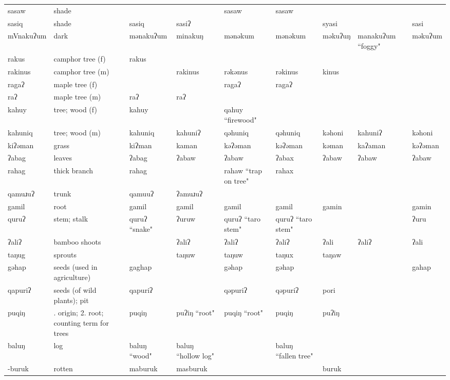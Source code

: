 \begin{landscape}
\begin{longtable}{*{9}{>{\raggedright\arraybackslash}p{}}}
\text{*}sasaw & shade &  &  & sasaw & sasaw &  &  & \\
\text{*}sasiq & shade & sasiq & sasiʔ &  &  & syasi &  & sasi\\
\text{*}mVnakuʔum & dark & mənakuʔum & minakuŋ & mənəkum & mənəkum & məkuʔuŋ & manakuʔum ``foggy" & məkuʔum\\
\text{*}rakus & camphor tree (f) & rakus &  &  &  &  &  & \\
\text{*}rakinus & camphor tree (m) &  & rakinus & rəkənus & rəkinus & kinus &  & \\
\text{*}ragaʔ & maple tree (f) &  &  & ragaʔ & ragaʔ &  &  & \\
\text{*}raʔ & maple tree (m) & raʔ & raʔ &  &  &  &  & \\
\text{*}kahuy & tree; wood (f) & kahuy &  & qahuy ``firewood" &  &  &  & \\
\text{*}kahuniq & tree; wood (m) & kahuniq & kahuniʔ & qəhuniq & qəhuniq & kəhoni & kahuniʔ & kəhoni\\
\text{*}kiʔəman & grass & kiʔman & kaman & kəʔəman & kəʔəman & kəman & kaʔaman & kəʔəman\\
\text{*}ʔabag & leaves & ʔabag & ʔabaw & ʔabaw & ʔabax & ʔabaw & ʔabaw & ʔabaw\\
\text{*}rahag & thick branch & rahag &  & rahaw ``trap on tree" & rahax &  &  & \\
\text{*}qamuɹuʔ & trunk & qamuuʔ & ʔamuɹuʔ &  &  &  &  & \\
\text{*}gamil & root & gamil & gamil & gamil & gamil & gamin &  & gamin\\
\text{*}quruʔ & stem; stalk & quruʔ ``snake" & ʔuruw & quruʔ ``taro stem" & quruʔ ``taro stem" &  &  & ʔuru\\
\text{*}ʔaliʔ & bamboo shoots &  & ʔaliʔ & ʔaliʔ & ʔaliʔ & ʔali & ʔaliʔ & ʔali\\
\text{*}taŋug & sprouts &  & taŋuw & taŋuw & taŋux & taŋaw &  & \\
\text{*}gəhap & seeds (used in agriculture) & gaghap &  & gəhap & gəhap &  &  & gahap\\
\text{*}qapuriʔ & seeds (of wild plants); pit & qapuriʔ &  & qəpuriʔ & qəpuriʔ & pori &  & \\
\text{*}puqiŋ & 1. origin; 2. root; counting term for trees & puqiŋ & puʔiŋ ``root" & puqiŋ ``root" & puqiŋ & puʔiŋ &  & \\
\text{*}baluŋ & log & baluŋ ``wood" & baluŋ ``hollow log" &  & baluŋ ``fallen tree" &  &  & \\
\text{*}-buruk & rotten & maburuk & masburuk &  &  & buruk &  & \\

\end{longtable}
\end{landscape}
